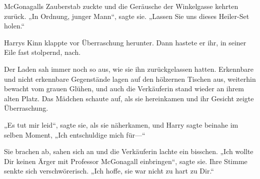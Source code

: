 McGonagalls Zauberstab zuckte und die Geräusche der Winkelgasse kehrten zurück. „In Ordnung, junger Mann“, sagte sie. „Lassen Sie uns dieses Heiler-Set holen.“

Harrys Kinn klappte vor Überraschung herunter. Dann hastete er ihr, in seiner Eile fast stolpernd, nach.

\later

Der Laden sah immer noch so aus, wie sie ihn zurückgelassen hatten. Erkennbare und nicht erkennbare Gegenstände lagen auf den hölzernen Tischen aus, weiterhin bewacht vom grauen Glühen, und auch die Verkäuferin stand wieder an ihrem alten Platz. Das Mädchen schaute auf, als sie hereinkamen und ihr Gesicht zeigte Überraschung.

„Es tut mir leid“, sagte sie, als sie näherkamen, und Harry sagte beinahe im selben Moment, „Ich entschuldige mich für—“

Sie brachen ab, sahen sich an und die Verkäuferin lachte ein bisschen. „Ich wollte Dir keinen Ärger mit Professor McGonagall einbringen“, sagte sie. Ihre Stimme senkte sich verschwörerisch. „Ich hoffe, sie war nicht zu hart zu Dir.“

